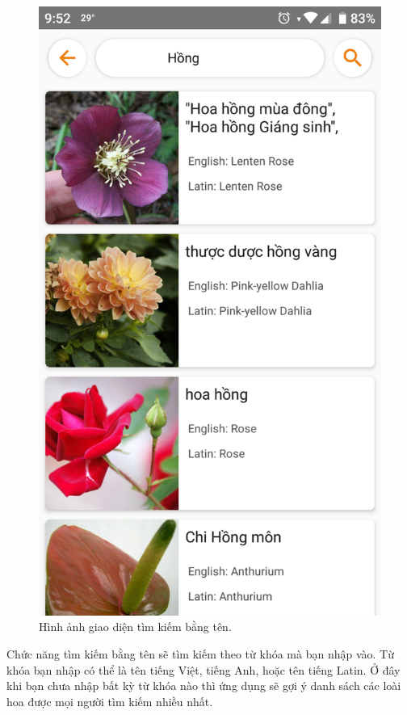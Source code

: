 \documentclass[12pt]{report}
\begin{document}
\begin{figure}[h]
			\includegraphics[scale=0.2]{app_search_name}
			\caption{Hình ảnh giao diện tìm kiếm bằng tên.}
			\label{fig:app_search_name}
		\end{figure}
		Chức năng tìm kiếm bằng tên sẽ tìm kiếm theo từ khóa mà bạn nhập vào. 
		Từ khóa bạn nhập có thể là tên tiếng Việt, tiếng Anh, hoặc tên tiếng Latin.
		Ở đây khi bạn chưa nhập bất kỳ từ khóa nào thì ứng dụng sẽ gợi ý danh sách các loài hoa được mọi người tìm kiếm nhiều nhất.
		\newpage
		
\end{document}
